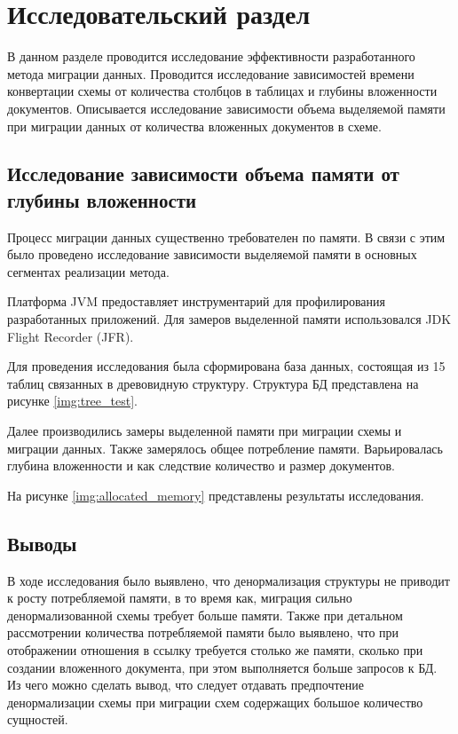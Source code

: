 \chapter{Исследовательский раздел}
В данном разделе проводится исследование эффективности разработанного метода миграции данных.
Проводится исследование зависимостей времени конвертации схемы от количества столбцов в таблицах 
и глубины вложенности документов. 
Описывается исследование зависимости объема выделяемой памяти при миграции данных 
от количества вложенных документов в схеме.

\section{Исследование зависимости объема памяти от глубины вложенности}
Процесс миграции данных существенно требователен по памяти.
В связи с этим было проведено исследование зависимости выделяемой памяти в основных сегментах реализации метода.

Платформа JVM предоставляет инструментарий для профилирования разработанных приложений.
Для замеров выделенной памяти использовался JDK Flight Recorder (JFR).

Для проведения исследования была сформирована база данных, 
состоящая из 15 таблиц связанных в древовидную структуру.
Структура БД представлена на рисунке \ref{img:tree_test}.

\clearpage

Далее производились замеры выделенной памяти при миграции схемы и миграции данных. 
Также замерялось общее потребление памяти. 
Варьировалась глубина вложенности и как следствие количество и размер документов.

На рисунке \ref{img:allocated_memory} представлены результаты исследования.

\section*{Выводы}
В ходе исследования было выявлено, 
что денормализация структуры не приводит
к росту потребляемой памяти, в то время как, 
миграция сильно денормализованной схемы требует больше памяти.
Также при детальном рассмотрении количества потребляемой памяти
было выявлено, что при отображении отношения в ссылку требуется столько же памяти,
сколько при создании вложенного документа, при этом выполняется больше запросов к БД.
Из чего можно сделать вывод, что следует отдавать предпочтение денормализации схемы 
при миграции схем содержащих большое количество сущностей.

